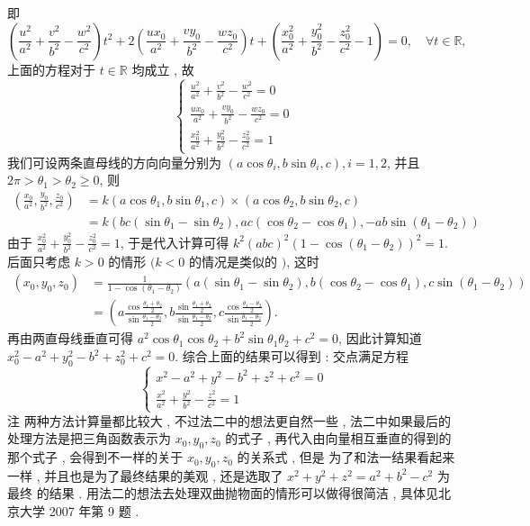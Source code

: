 \documentclass[10pt]{article}
\begin{document}
 即 
$$
\left(\frac{u^{2}}{a^{2}}+\frac{v^{2}}{b^{2}}-\frac{w^{2}}{c^{2}}\right) t^{2}+2\left(\frac{u x_{0}}{a^{2}}+\frac{v y_{0}}{b^{2}}-\frac{w z_{0}}{c^{2}}\right) t+\left(\frac{x_{0}^{2}}{a^{2}}+\frac{y_{0}^{2}}{b^{2}}-\frac{z_{0}^{2}}{c^{2}}-1\right)=0, \quad \forall t \in \mathbb{R},
$$
 上面的方程对于  $t \in \mathbb{R}$  均成立 ,  故 
$$
\left\{\begin{array}{c}
\frac{u^{2}}{a^{2}}+\frac{v^{2}}{b^{2}}-\frac{w^{2}}{c^{2}}=0 \\
\frac{u x_{0}}{a^{2}}+\frac{v y_{0}}{b^{2}}-\frac{w z_{0}}{c^{2}}=0 \\
\frac{x_{0}^{2}}{a^{2}}+\frac{y_{0}^{2}}{b^{2}}-\frac{z_{0}^{2}}{c^{2}}=1
\end{array}\right.
$$
 我们可设两条直母线的方向向量分别为  $\left(a \cos \theta_{i}, b \sin \theta_{i}, c\right), i=1,2$,  并且  $2 \pi>\theta_{1}>\theta_{2} \geqslant 0$,  则 
$$
\begin{aligned}
\left(\frac{x_{0}}{a^{2}}, \frac{y_{0}}{b^{2}}, \frac{z_{0}}{c^{2}}\right) &=k\left(a \cos \theta_{1}, b \sin \theta_{1}, c\right) \times\left(a \cos \theta_{2}, b \sin \theta_{2}, c\right) \\
&=k\left(b c\left(\sin \theta_{1}-\sin \theta_{2}\right), a c\left(\cos \theta_{2}-\cos \theta_{1}\right),-a b \sin \left(\theta_{1}-\theta_{2}\right)\right)
\end{aligned}
$$
 由于  $\frac{x_{0}^{2}}{a^{2}}+\frac{y_{0}^{2}}{b^{2}}-\frac{z_{0}^{2}}{c^{2}}=1$,  于是代入计算可得  $k^{2}(a b c)^{2}\left(1-\cos \left(\theta_{1}-\theta_{2}\right)\right)^{2}=1$.  后面只考虑  $k>0$  的情形  $(k<0$  的情况是类似的  $)$,  这时 
$$
\begin{aligned}
\left(x_{0}, y_{0}, z_{0}\right) &=\frac{1}{1-\cos \left(\theta_{1}-\theta_{2}\right)}\left(a\left(\sin \theta_{1}-\sin \theta_{2}\right), b\left(\cos \theta_{2}-\cos \theta_{1}\right), c \sin \left(\theta_{1}-\theta_{2}\right)\right) \\
&=\left(a \frac{\cos \frac{\theta_{1}+\theta_{2}}{2}}{\sin \frac{\theta_{1}-\theta_{2}}{2}}, b \frac{\sin \frac{\theta_{1}+\theta_{2}}{2}}{\sin \frac{\theta_{1}-\theta_{2}}{2}}, c \frac{\cos \frac{\theta_{1}-\theta_{2}}{2}}{\sin \frac{\theta_{1}-\theta_{2}}{2}}\right) .
\end{aligned}
$$
 再由两直母线垂直可得  $a^{2} \cos \theta_{1} \cos \theta_{2}+b^{2} \sin \theta_{1} \theta_{2}+c^{2}=0$,  因此计算知道  $x_{0}^{2}-a^{2}+y_{0}^{2}-b^{2}+z_{0}^{2}+c^{2}=0$.  综合上面的结果可以得到 :  交点满足方程 
$$
\left\{\begin{array}{r}
x^{2}-a^{2}+y^{2}-b^{2}+z^{2}+c^{2}=0 \\
\frac{x^{2}}{a^{2}}+\frac{y^{2}}{b^{2}}-\frac{z^{2}}{c^{2}}=1
\end{array}\right.
$$
 注   两种方法计算量都比较大 ,  不过法二中的想法更自然一些 ,  法二中如果最后的处理方法是把三角函数表示为  $x_{0}, y_{0}, z_{0}$  的式子 ,  再代入由向量相互垂直的得到的那个式子 ,  会得到不一样的关于  $x_{0}, y_{0}, z_{0}$  的关系式 ,  但是   为了和法一结果看起来一样 ,  并且也是为了最终结果的美观 ,  还是选取了  $x^{2}+y^{2}+z^{2}=a^{2}+b^{2}-c^{2}$  为最终   的结果 .  用法二的想法去处理双曲抛物面的情形可以做得很简洁 ,  具体见北京大学  2007  年第  9  题 .
\end{document}
